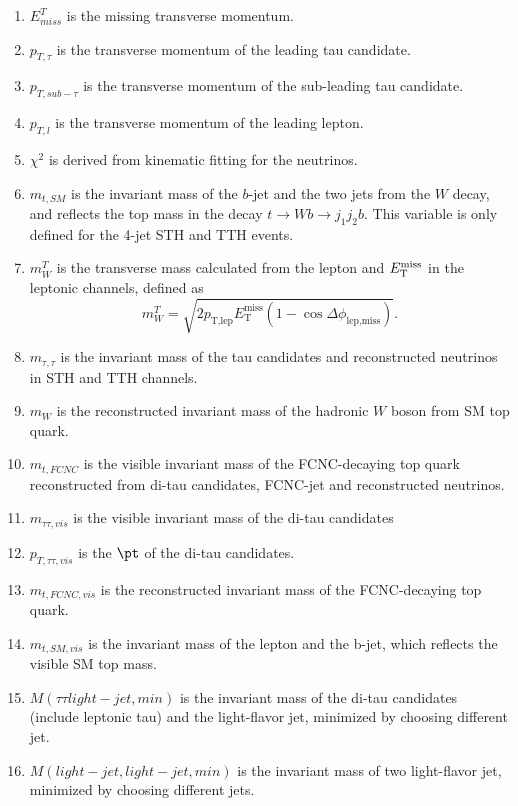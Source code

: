 \begin{enumerate}

\item $E^{T}_{miss}$ is the missing transverse momentum.
\item $p_{T,\tau}$ is the transverse momentum of the leading tau candidate.
\item $p_{T,sub-\tau}$ is the transverse momentum of the sub-leading tau candidate.
\item $p_{T,l}$ is the transverse momentum of the leading lepton.
\item $\chi^2$ is derived from kinematic fitting for the neutrinos.
\item $m_{t,SM}$ is the invariant mass of the $b$-jet and the two jets from the $W$ decay, and reflects the top mass in the decay $t\to Wb \to j_1j_2b$. This variable is only defined for the 4-jet STH and TTH events.
\item $m^{T}_{W}$ is the transverse mass calculated from the lepton and $E_{\text{T}}^{\text{miss}}$ in the leptonic channels, defined as
\begin{equation}
m^{T}_{W} = \sqrt{2 p_{\text{T,lep}} E_{\text{T}}^{\text{miss}} \left(1-\cos\Delta\phi_{\text{lep,miss}} \right)}.  
\end{equation}
\item $m_{\tau,\tau}$ is the invariant mass of the tau candidates and reconstructed neutrinos in STH and TTH channels. 
\item $m_{W}$ is the reconstructed invariant mass of the hadronic $W$ boson from SM top quark.
\item $m_{t,FCNC}$ is the visible invariant mass of the FCNC-decaying top quark reconstructed from di-tau candidates, FCNC-jet and reconstructed neutrinos.
\item $m_{\tau\tau,vis}$ is the visible invariant mass of the di-tau candidates
\item $p_{T,\tau\tau,vis}$ is the $\pt$ of the di-tau candidates.
\item $m_{t,FCNC,vis}$ is the reconstructed invariant mass of the FCNC-decaying top quark.
\item $m_{t,SM,vis}$ is the invariant mass of the lepton and the b-jet, which reflects the visible SM top mass.
\item $M(\tau\tau light-jet,min)$ is the invariant mass of the di-tau candidates (include leptonic tau) and the light-flavor jet, minimized by choosing different jet.
\item $M(light-jet,light-jet,min)$ is the invariant mass of two light-flavor jet, minimized by choosing different jets.

\end{enumerate}
